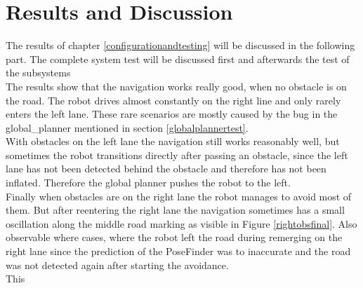 \chapter{Results and Discussion}
\label{resultanddiscussion}


The results of chapter \ref{configurationandtesting} will be discussed in the following part. The complete system test will be discussed first and afterwards the test of the subsystems\\

The results show that the navigation works really good, when no obstacle is on the road. The robot drives almost constantly on the right line and only rarely enters the left lane. These rare scenarios are mostly caused by the bug in the global\_planner mentioned in section \ref{globalplannertest}.\\

With obstacles on the left lane the navigation still works reasonably well, but sometimes the robot transitions directly after passing an obstacle, since the left lane has not been detected behind the obstacle and therefore has not been inflated. Therefore the global planner pushes the robot to the left.\\

Finally when obstacles are on the right lane the robot manages to avoid most of them. But after reentering the right lane the navigation sometimes has a small oscillation along the middle road marking as visible in Figure \ref{rightobsfinal}. Also observable where cases, where the robot left the road during remerging on the right lane since the prediction of the PoseFinder was to inaccurate and the road was not detected again after starting the avoidance.\\

This 





